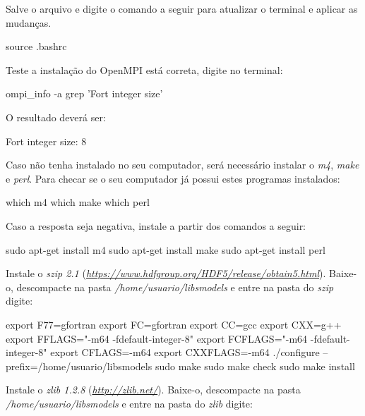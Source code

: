 \noindent Salve o arquivo e digite o comando a seguir para atualizar o terminal e aplicar as mudanças.
\bigskip

\begin{bashcode}
source .bashrc
\end{bashcode}
\bigskip

\noindent Teste a instalação do OpenMPI está correta, digite no terminal:
\bigskip

\begin{bashcode}
ompi_info -a grep 'Fort integer size'
\end{bashcode}
\bigskip

\noindent O resultado deverá ser:
\bigskip

\begin{bashcode}
Fort integer size: 8
\end{bashcode}
\bigskip

\noindent Caso não tenha instalado no seu computador, será necessário instalar o \textit{m4}, \textit{make} e \textit{perl}. Para checar se o seu computador já possui estes programas instalados:
\bigskip

\begin{bashcode}
which m4
which make
which perl
\end{bashcode}
\bigskip

\noindent Caso a resposta seja negativa, instale a partir dos comandos a seguir:
\bigskip

\begin{bashcode}
sudo apt-get install m4
sudo apt-get install make
sudo apt-get install perl
\end{bashcode}
\bigskip

\noindent Instale o \textit{szip 2.1} (\textcolor{bleu_cite}{\href{https://www.hdfgroup.org/HDF5/release/obtain5.html}{\textit{https://www.hdfgroup.org/HDF5/release/obtain5.html}}}). Baixe-o, descompacte na pasta \textit{/home/usuario/libsmodels} e entre na pasta do \textit{szip} digite:
\bigskip

\begin{bashcode}
export F77=gfortran
export FC=gfortran
export CC=gcc
export CXX=g++
export FFLAGS="-m64 -fdefault-integer-8"
export FCFLAGS="-m64 -fdefault-integer-8"
export CFLAGS=-m64
export CXXFLAGS=-m64
./configure --prefix=/home/usuario/libsmodels
sudo make
sudo make check
sudo make install
\end{bashcode}
\bigskip

\noindent Instale o \textit{zlib 1.2.8} (\textcolor{bleu_cite}{\href{http://zlib.net/}{\textit{http://zlib.net/}}}). Baixe-o, descompacte na pasta \textit{/home/usuario/libsmodels} e entre na pasta do \textit{zlib} digite:
\bigskip

